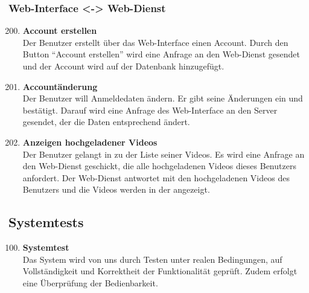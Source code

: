 \subsubsection{\gls{Web-Interface} <-> \gls{Web-Dienst}}
\begin{enumerate}[\bfseries{TI}10]  
\setcounter{enumi}{199}{}

\item \textbf{Account erstellen} \hfill\\
Der Benutzer erstellt \"uber das \gls{Web-Interface} einen Account. Durch den Button ``Account erstellen'' wird eine Anfrage an den \gls{Web-Dienst} gesendet und der Account wird auf der Datenbank hinzugef\"ugt.

\item \textbf{Account\"anderung} \hfill\\
Der Benutzer will Anmeldedaten \"andern. Er gibt seine Änderungen ein und best\"atigt. Darauf wird eine Anfrage des \gls{Web-Interface} an den Server gesendet, der die Daten entsprechend ändert.

\item \textbf{Anzeigen hochgeladener Videos} \hfill\\
Der Benutzer gelangt in zu der Liste seiner Videos. Es wird  eine Anfrage an den \gls{Web-Dienst} geschickt, die alle hochgeladenen Videos dieses Benutzers anfordert. Der Web-Dienst antwortet mit den hochgeladenen Videos des Benutzers und die Videos werden in der angezeigt. 

\end{enumerate}

\subsection{Systemtests}
\begin{enumerate}[\bfseries{TS}10]  
\setcounter{enumi}{99}{}

\item \textbf{Systemtest} \hfill\\  
Das System wird von uns durch Testen unter realen Bedingungen, auf Vollständigkeit und Korrektheit der Funktionalität geprüft. Zudem erfolgt eine Überprüfung der Bedienbarkeit. 
\end{enumerate}
